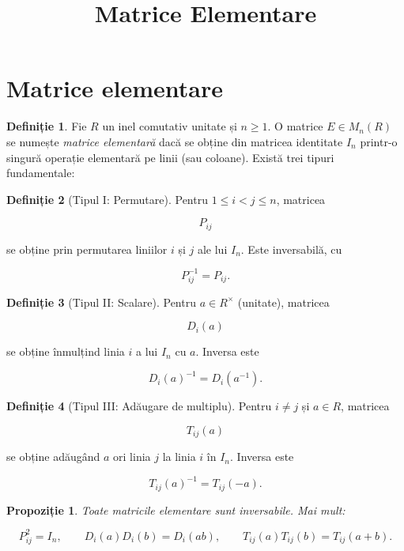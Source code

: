 \documentclass[12pt]{article}
\title{Matrice Elementare}
\author{}
\date{}
\theoremstyle{definition}
\newtheorem{definition}{Definiție}
\theoremstyle{plain}
\newtheorem{proposition}{Propoziție}
\begin{document}
\maketitle

\section*{Matrice elementare}

\begin{definition}
Fie $R$ un inel comutativ unitate și $n \ge 1$. O matrice $E \in M_n(R)$ se numește
\emph{matrice elementară} dacă se obține din matricea identitate $I_n$ printr-o singură
operație elementară pe linii (sau coloane). Există trei tipuri fundamentale:
\end{definition}

\begin{definition}[Tipul I: Permutare]
Pentru $1 \le i < j \le n$, matricea


\[
P_{ij}
\]


se obține prin permutarea liniilor $i$ și $j$ ale lui $I_n$. Este inversabilă, cu


\[
P_{ij}^{-1} = P_{ij}.
\]


\end{definition}

\begin{definition}[Tipul II: Scalare]
Pentru $a \in R^\times$ (unitate), matricea


\[
D_i(a)
\]


se obține înmulțind linia $i$ a lui $I_n$ cu $a$. Inversa este


\[
D_i(a)^{-1} = D_i(a^{-1}).
\]


\end{definition}

\begin{definition}[Tipul III: Adăugare de multiplu]
Pentru $i \ne j$ și $a \in R$, matricea


\[
T_{ij}(a)
\]


se obține adăugând $a$ ori linia $j$ la linia $i$ în $I_n$. Inversa este


\[
T_{ij}(a)^{-1} = T_{ij}(-a).
\]


\end{definition}

\begin{proposition}
Toate matricile elementare sunt inversabile. Mai mult:


\[
P_{ij}^2 = I_n, \qquad
D_i(a) D_i(b) = D_i(ab), \qquad
T_{ij}(a) T_{ij}(b) = T_{ij}(a+b).
\]


\end{proposition}
\end{document}
